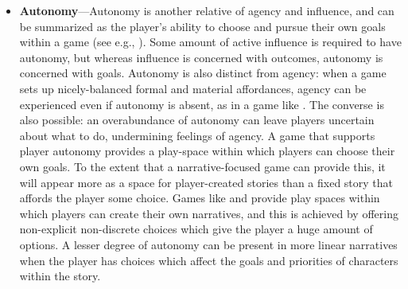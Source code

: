 \begin{itemize}
\item \textbf{Autonomy}---Autonomy is another relative of agency and influence, and can be summarized as the player's ability to choose and pursue their own goals within a game (see e.g., \citep{Ryan2006}).
%
Some amount of active influence is required to have autonomy, but whereas influence is concerned with outcomes, autonomy is concerned with goals.
%
Autonomy is also distinct from agency: when a game sets up nicely-balanced formal and material affordances, agency can be experienced even if autonomy is absent, as in a game like .
%
The converse is also possible: an overabundance of autonomy can leave players uncertain about what to do, undermining feelings of agency.
%
A game that supports player autonomy provides a play-space within which players can choose their own goals.
%
To the extent that a narrative-focused game can provide this, it will appear more as a space for player-created stories than a fixed story that affords the player some choice.
%
Games like  \citep{SimCity} and  \citep{TheSims} provide play spaces within which players can create their own narratives, and this is achieved by offering non-explicit non-discrete choices which give the player a huge amount of options.
%
A lesser degree of autonomy can be present in more linear narratives when the player has choices which affect the goals and priorities of characters within the story.



\end{itemize}
